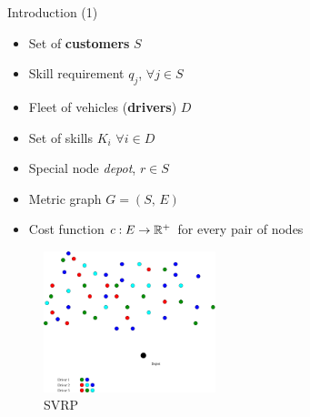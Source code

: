 \begin{frame}[t]{Introduction (1)}
    \begin{minipage}[t]{0.48\textwidth}
        \begin{itemize}
            \item<1-> Set of \textbf{customers} $S$
            \item<2-> Skill requirement $q_j$,  $\forall j \in S$
            \item<3-> Fleet of vehicles (\textbf{drivers}) $D$
            \item<4-> Set of skills $K_i$ $\forall i \in D$
            \item<5-> Special node \emph{depot}, $r \in S$
            \item<6-> Metric graph $G = (S, \, E)$
            \item<7-> Cost function $c:E \rightarrow \mathbb{R}^+$ for every pair of nodes
        \end{itemize}
    \end{minipage}
    \begin{minipage}[t]{0.48\textwidth}
        \begin{figure}
            \centering
            \includegraphics[width=5cm]{VRPSS01.pdf}
            \caption{SVRP}
            \label{fig:VRPSS01}
        \end{figure}            
    \end{minipage}
\end{frame}

